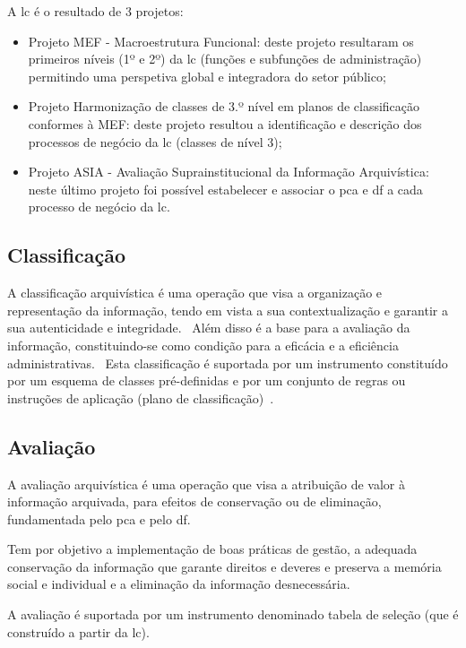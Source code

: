 A \acrshort{lc} é o resultado de 3 projetos:
\begin{itemize}
    \item Projeto MEF - Macroestrutura Funcional: deste projeto resultaram os primeiros níveis (1º e 2º) da 
    \acrshort{lc} (funções e subfunções de administração) permitindo uma perspetiva global e integradora do 
    setor público;
    \item Projeto Harmonização de classes de 3.º nível em planos de classificação conformes à MEF: deste projeto 
    resultou a identificação e descrição dos processos de negócio da \acrshort{lc} (classes de nível 3);
    \item Projeto ASIA - Avaliação Suprainstitucional da Informação Arquivística: neste último projeto foi possível 
    estabelecer e associar  
    o \acrshort{pca} e \acrshort{df} a cada processo de negócio da \acrshort{lc}.
\end{itemize}

\subsection{Classificação}

A classificação arquivística é uma operação que visa a organização e representação da informação, tendo em vista a 
sua contextualização e garantir a sua autenticidade e integridade.~\cite{clavClass} 
Além disso é a base para a avaliação da informação, constituindo-se como condição para a eficácia e a eficiência 
administrativas.~\cite{clavClass} 
Esta classificação é suportada por um instrumento constituído por um esquema de classes pré-definidas e por um 
conjunto de regras ou instruções de aplicação (plano de classificação)~\cite{clavClass}.

\subsection{Avaliação}

A avaliação arquivística é uma operação que visa a atribuição de valor à informação arquivada, para efeitos de 
conservação ou de eliminação, fundamentada pelo \acrshort{pca} e pelo \acrshort{df}.~\cite{clavClass}

Tem por objetivo a implementação de boas práticas de gestão, a adequada conservação da informação que garante 
direitos e deveres e preserva a memória social e individual e a eliminação da informação desnecessária.~\cite{clavClass}

A avaliação é suportada por um instrumento denominado tabela de seleção (que é construído a partir da \acrshort{lc}).

